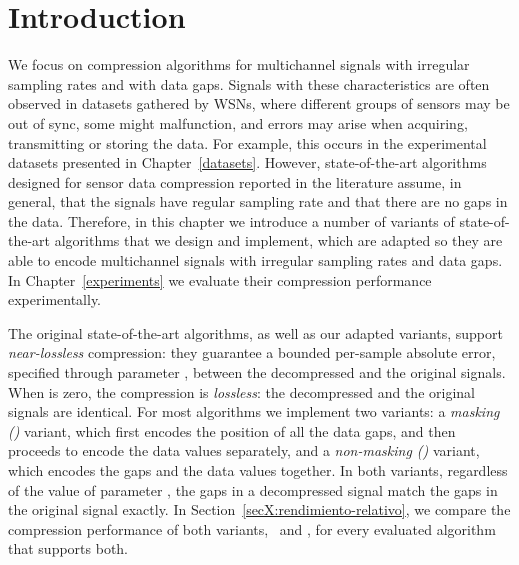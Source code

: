 

\section{Introduction}
\label{algo:overview}

\vspace{-1pt}
We focus on compression algorithms for multichannel signals with irregular sampling rates and with data gaps. Signals with these characteristics are often observed in datasets gathered by WSNs, where different groups of sensors may be out of sync, some might malfunction, and errors may arise when acquiring, transmitting or storing the data. For example, this occurs in the experimental datasets presented in Chapter~\ref{datasets}. However, state-of-the-art algorithms designed for sensor data compression reported in the literature \cite{AnEva2013, Signal2016} assume, in general, that the signals have regular sampling rate and that there are no gaps in the data. Therefore, in this chapter we introduce a number of variants of state-of-the-art algorithms that we design and implement, which are adapted so they are able to encode multichannel signals with irregular sampling rates and data gaps. In Chapter~\ref{experiments} we evaluate their compression performance experimentally.


\newcommand{\spaceForThisSection}{\vspace{+1.5pt}}
\spaceForThisSection
The original state-of-the-art algorithms, as well as our adapted variants, support \textit{near-lossless} compression: they guarantee a bounded per-sample absolute error,  specified through parameter \maxerror, between the decompressed and the original signals. When \maxerror is zero, the compression is \textit{lossless}: the decompressed and the original signals are identical. For most algorithms we implement two variants: a \textit{masking (\maskalgo)} variant, which first encodes the position of all the data gaps, and then proceeds to encode the data values separately, and a \textit{non-masking (\NOmaskalgo)} variant, which encodes the gaps and the data values together. In both variants, regardless of the value of parameter \maxerror, the gaps in a decompressed signal match the gaps in the original signal exactly. In Section~\ref{secX:rendimiento-relativo}, we compare the compression performance of both variants, \maskalgo\ and \NOmaskalgo, for every evaluated algorithm that supports both.


